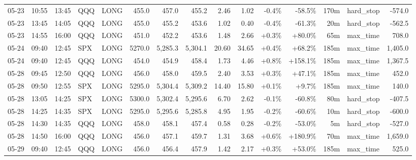 \documentclass[11pt,a4paper,twoside]{article}
\begin{document}
\begin{landscape}
\begin{center}
\begin{longtable}{>{\color{txtmain}}l l l l l r r r r r r r r >{\color{txtmain}}l r}
05-23 & 10:55 & 13:45 & QQQ & LONG & 455.0 & 457.0 & 455.2 & 2.46 & 1.02 & \textcolor{lossred}{-0.4\%} & \textcolor{lossred}{-58.5\%} & 170m & hard\_stop & \textcolor{lossred}{-574.0} \\
05-23 & 13:45 & 14:05 & QQQ & LONG & 455.0 & 455.2 & 453.6 & 1.02 & 0.40 & \textcolor{lossred}{-0.4\%} & \textcolor{lossred}{-61.3\%} & 20m & hard\_stop & \textcolor{lossred}{-562.5} \\
05-23 & 14:55 & 16:00 & QQQ & LONG & 451.0 & 452.2 & 453.6 & 1.48 & 2.66 & \textcolor{wingreen}{+0.3\%} & \textcolor{wingreen}{+80.0\%} & 65m & max\_time & \textcolor{wingreen}{708.0} \\
05-24 & 09:40 & 12:45 & SPX & LONG & 5270.0 & 5,285.3 & 5,304.1 & 20.60 & 34.65 & \textcolor{wingreen}{+0.4\%} & \textcolor{wingreen}{+68.2\%} & 185m & max\_time & \textcolor{wingreen}{1,405.0} \\
05-24 & 09:40 & 12:45 & QQQ & LONG & 454.0 & 454.9 & 458.4 & 1.73 & 4.46 & \textcolor{wingreen}{+0.8\%} & \textcolor{wingreen}{+158.1\%} & 185m & max\_time & \textcolor{wingreen}{1,367.5} \\
05-28 & 09:45 & 12:50 & QQQ & LONG & 456.0 & 458.0 & 459.5 & 2.40 & 3.53 & \textcolor{wingreen}{+0.3\%} & \textcolor{wingreen}{+47.1\%} & 185m & max\_time & \textcolor{wingreen}{452.0} \\
05-28 & 09:50 & 12:55 & SPX & LONG & 5295.0 & 5,304.4 & 5,309.2 & 14.40 & 15.80 & \textcolor{wingreen}{+0.1\%} & \textcolor{wingreen}{+9.7\%} & 185m & max\_time & \textcolor{wingreen}{140.0} \\
05-28 & 13:05 & 14:25 & SPX & LONG & 5300.0 & 5,302.4 & 5,295.6 & 6.70 & 2.62 & \textcolor{lossred}{-0.1\%} & \textcolor{lossred}{-60.8\%} & 80m & hard\_stop & \textcolor{lossred}{-407.5} \\
05-28 & 14:25 & 14:35 & SPX & LONG & 5295.0 & 5,295.6 & 5,285.8 & 4.95 & 1.95 & \textcolor{lossred}{-0.2\%} & \textcolor{lossred}{-60.6\%} & 10m & hard\_stop & \textcolor{lossred}{-600.0} \\
05-28 & 14:30 & 14:35 & QQQ & LONG & 458.0 & 458.1 & 457.4 & 0.58 & 0.28 & \textcolor{lossred}{-0.2\%} & \textcolor{lossred}{-53.0\%} & 5m & hard\_stop & \textcolor{lossred}{-527.0} \\
05-28 & 14:50 & 16:00 & QQQ & LONG & 456.0 & 457.1 & 459.7 & 1.31 & 3.68 & \textcolor{wingreen}{+0.6\%} & \textcolor{wingreen}{+180.9\%} & 70m & max\_time & \textcolor{wingreen}{1,659.0} \\
05-29 & 09:40 & 12:45 & QQQ & LONG & 456.0 & 456.4 & 457.9 & 1.42 & 2.17 & \textcolor{wingreen}{+0.3\%} & \textcolor{wingreen}{+53.0\%} & 185m & max\_time & \textcolor{wingreen}{525.0} \\

\end{longtable}
\end{center}
\end{landscape}
\end{document}
